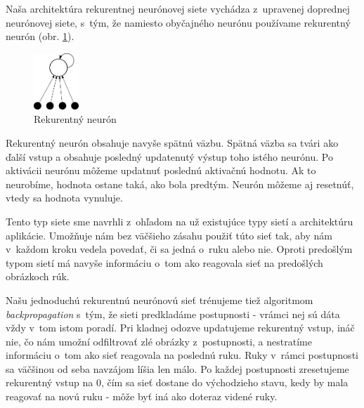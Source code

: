 Naša architektúra rekurentnej neurónovej siete vychádza z~upravenej doprednej neurónovej siete, s~tým, že namiesto obyčajného neurónu používame rekurentný neurón (obr. \ref{fig:recurentneuron}). 

\begin{figure}[htbp]
  \begin{center}
    \includegraphics[width=0.15\textwidth]{images/recneuron}
  \end{center}
  \caption{Rekurentný neurón}
  \label{fig:recurentneuron}
\end{figure}

Rekurentný neurón obsahuje navyše spätnú väzbu. Spätná väzba sa tvári ako ďalší vstup a obsahuje posledný updatenutý výstup toho istého neurónu. Po aktivácii neurónu môžeme updatnuť poslednú aktivačnú hodnotu. Ak to neurobíme, hodnota ostane taká, ako bola predtým. Neurón môžeme aj resetnúť, vtedy sa hodnota vynuluje.

Tento typ siete sme navrhli z~ohľadom na už existujúce typy sietí a architektúru aplikácie. Umožňuje nám bez väčšieho zásahu použiť túto sieť tak, aby nám v~každom kroku vedela povedať, či sa jedná o~ruku alebo nie. Oproti predošlým typom sietí má navyše informáciu o~tom ako reagovala sieť na predošlých obrázkoch rúk.

Našu jednoduchú rekurentnú neurónovú sieť trénujeme tiež algoritmom \textit{backpropagation} s~tým, že sieti predkladáme postupnosti - vrámci nej sú dáta vždy v~tom istom poradí. Pri kladnej odozve updatujeme rekurentný vstup, ináč nie, čo nám umožní odfiltrovať zlé obrázky z~postupnosti, a nestratíme informáciu o~tom ako sieť reagovala na poslednú ruku. Ruky v~rámci postupnosti sa väčšinou od seba navzájom líšia len málo. Po každej postupnosti zresetujeme rekurentný vstup na 0, čím sa sieť dostane do východzieho stavu, kedy by mala reagovať na novú ruku - môže byť iná ako doteraz videné ruky.